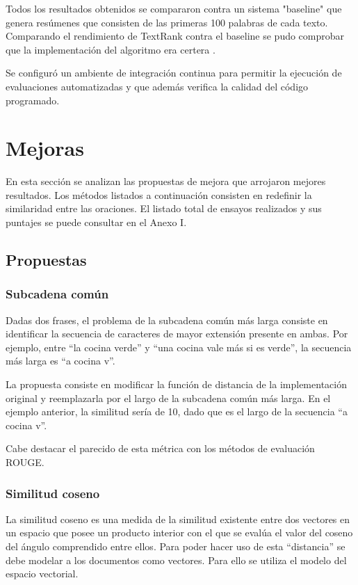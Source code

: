 \documentclass[a4paper]{article}
\begin{document}
Todos los resultados obtenidos se compararon contra un sistema "baseline" que genera resúmenes que consisten de las primeras 100 palabras de cada texto. Comparando el rendimiento de TextRank contra el baseline se pudo comprobar que la implementación del algoritmo era certera \cite{baselines}.

Se configuró un ambiente de integración continua para permitir la ejecución de evaluaciones automatizadas y que además verifica la calidad del código programado. 


\section{Mejoras}
En esta sección se analizan las propuestas de mejora que arrojaron mejores resultados. Los métodos listados a continuación consisten en redefinir la similaridad entre las oraciones. El listado total de ensayos realizados y sus puntajes se puede consultar en el Anexo I.

\subsection{Propuestas}

\subsubsection{Subcadena común}
Dadas dos frases, el problema de la subcadena común más larga consiste en identificar la secuencia de caracteres de mayor extensión presente en ambas. Por ejemplo, entre “la cocina verde” y “una cocina vale más si es verde”, la secuencia más larga es “a cocina v”.

La propuesta consiste en modificar la función de distancia de la implementación original y reemplazarla por el largo de la subcadena común más larga. En el ejemplo anterior, la similitud sería de 10, dado que es el largo de la secuencia “a cocina v”.

Cabe destacar el parecido de esta métrica con los métodos de evaluación ROUGE.


\subsubsection{Similitud coseno}
La similitud coseno es una medida de la similitud existente entre dos vectores en un espacio que posee un producto interior con el que se evalúa el valor del coseno del ángulo comprendido entre ellos. Para poder hacer uso de esta “distancia” se debe modelar a los documentos como vectores. Para ello se utiliza el modelo del espacio vectorial.
\end{document}
